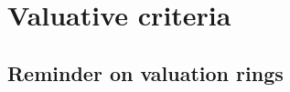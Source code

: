 \section{Valuative criteria}
\label{section:II.7}


\subsection{Reminder on valuation rings}
\label{subsection:II.7.1}






